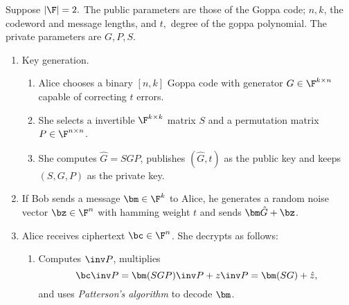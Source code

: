 Suppose $|\F| = 2.$
The public parameters are those of the Goppa code; $n,k$, the codeword and message lengths, and $t,$ degree of the goppa polynomial.
The private parameters are $G,P,S.$ 
\begin{enumerate}
    \item Key generation. 
    \begin{enumerate}
        \item Alice chooses a binary $[n,k]$ Goppa code with generator $G \in \F^{k \times n}$ capable of correcting $t$ errors. 
        \item She selects a invertible $\F^{k \times k}$ matrix $S$ and a permutation matrix $P \in \F^{n \times n}$. 
        \item She computes $\hat{G} = S GP$, publishes $(\hat{G},t)$ as the public key and keeps $(S,G,P)$ as the private key.
    \end{enumerate}
    \item If Bob sends a message $\bm \in \F^k$ to Alice, he generates a random noise vector $\bz \in \F^n$ with hamming weight $t$ and sends $\bm \hat{G} + \bz$.
    \item Alice receives ciphertext $\bc \in \F^n$.
    She decrypts as follows:
    \begin{enumerate}
        \item Computes $\inv P$, multiplies
        \[\bc \inv P = \bm(SGP) \inv P + z \inv P = \bm(S G) + \hat{z},\]
        and uses \textit{Patterson's algorithm} to decode $\bm$. 
    \end{enumerate}
\end{enumerate}